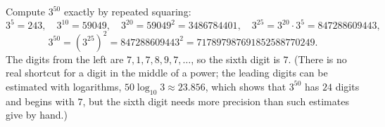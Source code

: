 Compute $3^{50}$ exactly by repeated squaring:
\[
3^{5}=243,\quad3^{10}=59049,\quad3^{20}=59049^2=3486784401,\quad3^{25}=3^{20}\cdot3^5=847288609443,
\]
\[
3^{50}=\left(3^{25}\right)^2=847288609443^2=717897987691852588770249 .
\]
The digits from the left are $7,1,7,8,9,7,\dots$, so the sixth digit is $\boxed{7}$. (There is no real shortcut for a digit in the middle of a power; the leading digits can be estimated with logarithms, $50\log_{10}3\approx23.856$, which shows that $3^{50}$ has $24$ digits and begins with $7$, but the sixth digit needs more precision than such estimates give by hand.)
